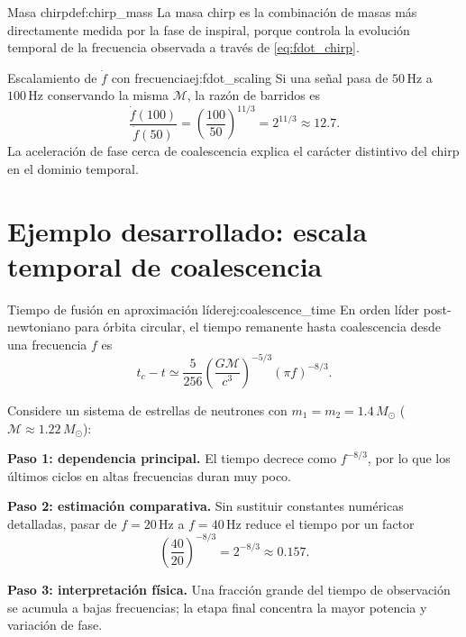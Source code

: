 \begin{definicion}{Masa chirp}{def:chirp_mass}
La masa chirp es la combinación de masas más directamente medida por la fase de inspiral, porque controla la evolución temporal de la frecuencia observada a través de \eqref{eq:fdot_chirp}.
\end{definicion}

\begin{ejemplo}{Escalamiento de $\dot f$ con frecuencia}{ej:fdot_scaling}
Si una señal pasa de $50\,\mathrm{Hz}$ a $100\,\mathrm{Hz}$ conservando la misma $\mathcal{M}$, la razón de barridos es
\begin{equation}
  \frac{\dot f(100)}{\dot f(50)}=\left(\frac{100}{50}\right)^{11/3}=2^{11/3}\approx 12.7.
\end{equation}
La aceleración de fase cerca de coalescencia explica el carácter distintivo del chirp en el dominio temporal.
\end{ejemplo}

\section{Ejemplo desarrollado: escala temporal de coalescencia}
\label{sec:ejemplo_tau}

\begin{ejemplo}{Tiempo de fusión en aproximación líder}{ej:coalescence_time}
En orden líder post-newtoniano para órbita circular, el tiempo remanente hasta coalescencia desde una frecuencia $f$ es
\begin{equation}
  t_c-t \simeq
  \frac{5}{256}
  \left(\frac{G\mathcal{M}}{c^3}\right)^{-5/3}
  (\pi f)^{-8/3}.
\end{equation}

Considere un sistema de estrellas de neutrones con $m_1=m_2=1.4\,M_\odot$ ($\mathcal{M}\approx1.22\,M_\odot$):

\textbf{Paso 1: dependencia principal.}
El tiempo decrece como $f^{-8/3}$, por lo que los últimos ciclos en altas frecuencias duran muy poco.

\textbf{Paso 2: estimación comparativa.}
Sin sustituir constantes numéricas detalladas, pasar de $f=20\,\mathrm{Hz}$ a $f=40\,\mathrm{Hz}$ reduce el tiempo por un factor
\begin{equation}
  \left(\frac{40}{20}\right)^{-8/3}=2^{-8/3}\approx0.157.
\end{equation}

\textbf{Paso 3: interpretación física.}
Una fracción grande del tiempo de observación se acumula a bajas frecuencias; la etapa final concentra la mayor potencia y variación de fase.
\end{ejemplo}

